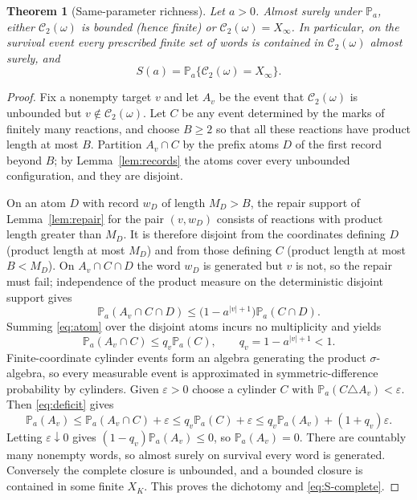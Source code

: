 \documentclass[11pt,reqno]{amsart}
\theoremstyle{plain}
\newtheorem{theorem}{Theorem}[section]
\theoremstyle{definition}
\theoremstyle{remark}
\numberwithin{equation}{section}
\newcommand{\Prob}{\mathbb{P}}
\newcommand{\cC}{\mathcal{C}}
\newcommand{\Xinf}{X_\infty}
\begin{document}
\begin{theorem}[Same-parameter richness]\label{thm:richness}
Let $a>0$. Almost surely under $\Prob_a$, either $\cC_2(\omega)$ is bounded (hence finite) or $\cC_2(\omega)=\Xinf$. In particular, on the survival event every prescribed finite set of words is contained in $\cC_2(\omega)$ almost surely, and
\begin{equation}\label{eq:S-complete}
S(a)=\Prob_a\{\cC_2(\omega)=\Xinf\}.
\end{equation}
\end{theorem}

\begin{proof}
Fix a nonempty target $v$ and let $A_v$ be the event that $\cC_2(\omega)$ is unbounded but $v\notin\cC_2(\omega)$. Let $C$ be any event determined by the marks of finitely many reactions, and choose $B\ge2$ so that all these reactions have product length at most $B$. Partition $A_v\cap C$ by the prefix atoms $D$ of the first record beyond $B$; by Lemma~\ref{lem:records} the atoms cover every unbounded configuration, and they are disjoint.

On an atom $D$ with record $w_D$ of length $M_D>B$, the repair support of Lemma~\ref{lem:repair} for the pair $(v,w_D)$ consists of reactions with product length greater than $M_D$. It is therefore disjoint from the coordinates defining $D$ (product length at most $M_D$) and from those defining $C$ (product length at most $B<M_D$). On $A_v\cap C\cap D$ the word $w_D$ is generated but $v$ is not, so the repair must fail; independence of the product measure on the deterministic disjoint support gives
\begin{equation}\label{eq:atom}
\Prob_a(A_v\cap C\cap D)\le\bigl(1-a^{|v|+1}\bigr)\Prob_a(C\cap D).
\end{equation}
Summing \eqref{eq:atom} over the disjoint atoms incurs no multiplicity and yields
\begin{equation}\label{eq:deficit}
\Prob_a(A_v\cap C)\le q_v\Prob_a(C),\qquad q_v=1-a^{|v|+1}<1.
\end{equation}
Finite-coordinate cylinder events form an algebra generating the product $\sigma$-algebra, so every measurable event is approximated in symmetric-difference probability by cylinders. Given $\varepsilon>0$ choose a cylinder $C$ with $\Prob_a(C\triangle A_v)<\varepsilon$. Then \eqref{eq:deficit} gives
\[
\Prob_a(A_v)\le\Prob_a(A_v\cap C)+\varepsilon\le q_v\Prob_a(C)+\varepsilon\le q_v\Prob_a(A_v)+(1+q_v)\varepsilon.
\]
Letting $\varepsilon\downarrow0$ gives $(1-q_v)\Prob_a(A_v)\le0$, so $\Prob_a(A_v)=0$. There are countably many nonempty words, so almost surely on survival every word is generated. Conversely the complete closure is unbounded, and a bounded closure is contained in some finite $X_K$. This proves the dichotomy and \eqref{eq:S-complete}.
\end{proof}
\end{document}
